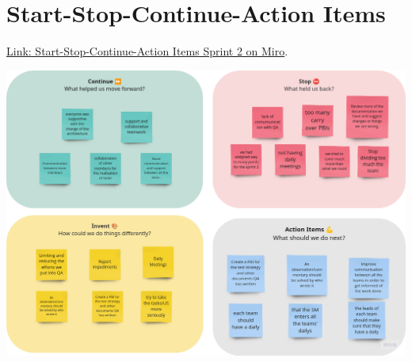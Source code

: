 \documentclass{article}
\begin{document}
\hypertarget{startstopcontinueactionitems-s2}{
\section{Start-Stop-Continue-Action Items}\label{Start-Stop-Continue-Action Items S2}}
\href{https://miro.com/app/board/uXjVKDO7l8M=/?moveToWidget=3458764590247693277&cot=14}{Link: Start-Stop-Continue-Action Items Sprint 2 on Miro}.

\includegraphics[width=\textwidth]{./assets/retrospective-s2.png}
\end{document}
